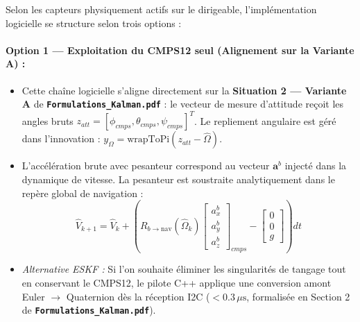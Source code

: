 \documentclass[../Implementation.tex]{subfiles}
\begin{document}
Selon les capteurs physiquement actifs sur le dirigeable, l'implémentation logicielle se structure selon trois options :

\paragraph{Option 1 — Exploitation du CMPS12 seul (Alignement sur la Variante A) :}
\begin{itemize}
    \item Cette chaîne logicielle s'aligne directement sur la \textbf{Situation 2 — Variante A} de \textbf{\texttt{Formulations\_Kalman.pdf}} : le vecteur de mesure d'attitude reçoit les angles bruts $z_{att} = [\phi_{cmps}, \theta_{cmps}, \psi_{cmps}]^T$. Le repliement angulaire est géré dans l'innovation : $y_\Omega = \text{wrapToPi}(z_{att} - \hat{\Omega})$.
    \item L'accélération brute avec pesanteur correspond au vecteur $\mathbf{a}^b$ injecté dans la dynamique de vitesse. La pesanteur est soustraite analytiquement dans le repère global de navigation :
    \begin{equation}
        \hat{V}_{k+1} = \hat{V}_k + \left( R_{b \to \text{nav}}(\hat{\Omega}_k) \begin{bmatrix} a_x^b \\ a_y^b \\ a_z^b \end{bmatrix}_{cmps} - \begin{bmatrix} 0 \\ 0 \\ g \end{bmatrix} \right) dt
    \end{equation}
    \item \textit{Alternative ESKF :} Si l'on souhaite éliminer les singularités de tangage tout en conservant le CMPS12, le pilote C++ applique une conversion amont Euler $\to$ Quaternion dès la réception I2C ($< 0.3\,\mu\text{s}$, formalisée en Section 2 de \textbf{\texttt{Formulations\_Kalman.pdf}}).
\end{itemize}
\end{document}
